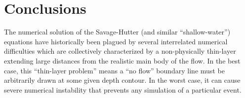 \documentclass[letterpaper,10pt]{article}
\begin{document}
%
%
% 
% 



\section{Conclusions} \label{conclusions}
The numerical solution of the Savage-Hutter (and similar 
``shallow-water'') equations have historically been plagued by 
several interrelated numerical difficulties which are collectively characterized by a non-physically thin-layer extending large distances from the realistic main body of the flow. In the best case, this ``thin-layer problem'' means a ``no flow'' boundary line must be arbitrarily drawn at some given depth contour.  In 
the worst case, it can cause severe numerical instability that 
prevents any simulation of a particular event.
\end{document}
